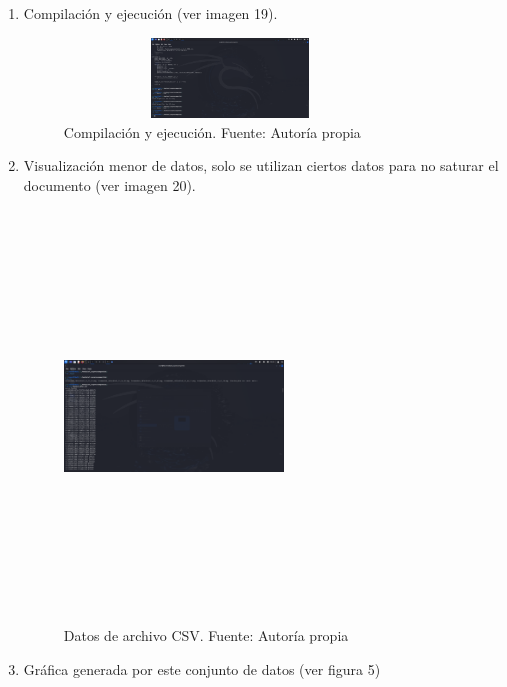 \begin{enumerate} 
	\def\labelenumi{\arabic{enumi}.} 
	\item Compilación y ejecución (ver imagen 19).
	
	\begin{figure}[H]
		\centering
		\includegraphics[width=3.46875in,height=0.8384in]{media/image36.png}
		\caption{Compilación y ejecución. Fuente: Autoría propia}
	\end{figure}
	
	\item Visualización menor de datos, solo se utilizan ciertos datos para no saturar el documento (ver imagen 20).
	
	\begin{figure}[H]
		\centering
		\includegraphics[width=2.29583in,height=4.29598in]{media/image35.png}
		\caption{Datos de archivo CSV. Fuente: Autoría propia}
	\end{figure}
	
	\item Gráfica generada por este conjunto de datos (ver figura 5)
	

\end{enumerate}
